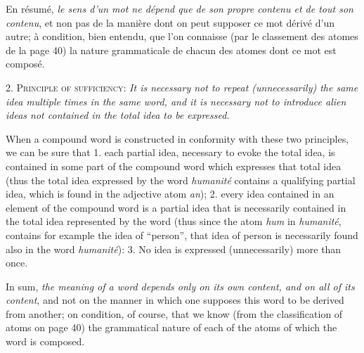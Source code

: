 \begin{sloppypar}
{  En résumé, \emph{le sens d'un mot ne dépend que de son propre
    contenu et de tout son contenu}, et non pas de la manière dont on
  peut supposer ce mot dérivé d’un autre; à condition, bien entendu,
  que l’on connaisse (par le classement des atomes de la page 40) la
  nature grammaticale de chacun des atomes dont ce mot est composé.

}
%
{2. \textsc{Principle of sufficiency}: \emph{It is necessary not to
    repeat (unnecessarily) the same idea multiple times in the same
    word, and it is necessary not to introduce alien ideas not
    contained in the total idea to be expressed.}

  When a compound word is constructed in conformity with these two
  principles, we can be sure that 1. each partial idea, necessary to
  evoke the total idea, is contained in some part of the compound word
  which expresses that total idea (thus the total idea expressed by
  the word \emph{humanité} contains a qualifying partial idea, which is
  found in the adjective atom \emph{an}); 2. every idea contained in an
  element of the compound word is a partial idea that is necessarily
  contained in the total idea represented by the word (thus since the
  atom \emph{hum} in \emph{humanité}, contains for example the idea of
  ``person'', that idea of person is necessarily found also in the
  word \emph{humanité}): 3. No idea is expressed (unnecessarily) more
  than once.

  In sum, \emph{the meaning of a word depends only on its own content,
    and on all of its content}, and not on the manner in which one
  supposes this word to be derived from another; on condition, of
  course, that we know (from the classification of atoms on page 40)
  the grammatical nature of each of the atoms of which the word is
  composed.

}

\end{sloppypar}
